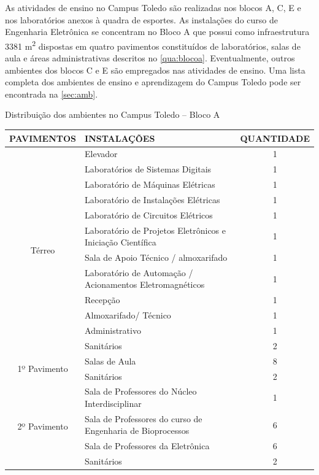 As atividades de ensino no Campus Toledo são realizadas nos blocos A, C, E e nos laboratórios anexos à quadra de esportes. As instalações do curso de Engenharia Eletrônica se concentram no Bloco A que possui como infraestrutura 3381 m\textsuperscript{2} dispostas em quatro pavimentos constituídos de laboratórios, salas de aula e áreas administrativas descritos no \autoref{qua:blocoa}. Eventualmente, outros ambientes dos blocos C e E são empregados nas atividades de ensino. Uma lista completa dos ambientes de ensino e aprendizagem do Campus Toledo pode ser encontrada na \autoref{sec:amb}.

\begin{quadro}
    \centering\small
	\caption[Distribuição dos ambientes no Campus Toledo – Bloco A]{Distribuição dos ambientes no Campus Toledo – Bloco A}
    \begin{tabularx}{\textwidth}{c >{\centering\arraybackslash}X  c}
        \toprule
        PAVIMENTOS & INSTALAÇÕES & QUANTIDADE \\ \midrule \midrule

        \multirow{12}{*}{ Térreo } & Elevador & 1 \\
        & Laboratórios de Sistemas Digitais & 1 \\
        & Laboratório de Máquinas Elétricas & 1 \\
        & Laboratório de Instalações Elétricas & 1 \\
        & Laboratório de Circuitos Elétricos & 1 \\
        & Laboratório de Projetos Eletrônicos e Iniciação Científica & 1 \\
        & Sala de Apoio Técnico / almoxarifado & 1 \\
        & Laboratório de Automação / Acionamentos Eletromagnéticos & 1 \\
        & Recepção & 1 \\
        & Almoxarifado/ Técnico & 1 \\
        & Administrativo & 1 \\
        & Sanitários & 2 \\ \midrule

        \multirow{2}{*}{ 1º Pavimento } & Salas de Aula & 8 \\
        & Sanitários & 2 \\ \midrule

        \multirow{4}{*}{ 2º Pavimento } & Sala de Professores do Núcleo Interdisciplinar & 1 \\
        & Sala de Professores do curso de Engenharia de Bioprocessos & 6 \\
        & Sala de Professores da Eletrônica & 6 \\
        & Sanitários & 2 \\ \midrule


\end{tabularx}
\end{quadro}

